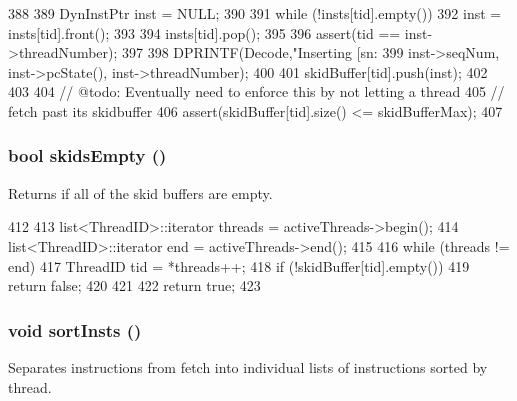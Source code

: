 \begin{DoxyCode}
388 {
389     DynInstPtr inst = NULL;
390 
391     while (!insts[tid].empty()) {
392         inst = insts[tid].front();
393 
394         insts[tid].pop();
395 
396         assert(tid == inst->threadNumber);
397 
398         DPRINTF(Decode,"Inserting [sn:%
399                 inst->seqNum, inst->pcState(), inst->threadNumber);
400 
401         skidBuffer[tid].push(inst);
402     }
403 
404     // @todo: Eventually need to enforce this by not letting a thread
405     // fetch past its skidbuffer
406     assert(skidBuffer[tid].size() <= skidBufferMax);
407 }
\end{DoxyCode}
\hypertarget{classDefaultDecode_afe3e2673d17dd5c568862ef5ae68b4d8}{
\subsubsection[{skidsEmpty}]{\setlength{\rightskip}{0pt plus 5cm}bool skidsEmpty ()}}
\label{classDefaultDecode_afe3e2673d17dd5c568862ef5ae68b4d8}
Returns if all of the skid buffers are empty. 


\begin{DoxyCode}
412 {
413     list<ThreadID>::iterator threads = activeThreads->begin();
414     list<ThreadID>::iterator end = activeThreads->end();
415 
416     while (threads != end) {
417         ThreadID tid = *threads++;
418         if (!skidBuffer[tid].empty())
419             return false;
420     }
421 
422     return true;
423 }
\end{DoxyCode}
\hypertarget{classDefaultDecode_a9ff2aa32ab0f40674cb3518108d62f8e}{
\subsubsection[{sortInsts}]{\setlength{\rightskip}{0pt plus 5cm}void sortInsts ()}}
\label{classDefaultDecode_a9ff2aa32ab0f40674cb3518108d62f8e}
Separates instructions from fetch into individual lists of instructions sorted by thread. 


